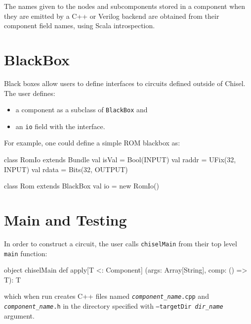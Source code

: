 \documentclass[10pt,twocolumn]{article}
\def\code#1{{\small\tt #1}}
\begin{document}
The names given to the nodes and subcomponents stored in a component
when they are emitted by a C++ or Verilog backend are obtained from
their component field names, using Scala introspection.


\section{BlackBox}

Black boxes allow users to define interfaces to circuits defined
outside of Chisel.  The user defines:

\begin{itemize}
\item a component as a subclass of \code{BlackBox} and
\item an \code{io} field with the interface.
\end{itemize}

\noindent
For example, one could define a simple ROM blackbox as:

\begin{scala}
class RomIo extends Bundle {
  val isVal = Bool(INPUT)
  val raddr = UFix(32, INPUT)
  val rdata = Bits(32, OUTPUT)
}

class Rom extends BlackBox {
  val io = new RomIo()
}
\end{scala}

\section{Main and Testing}

In order to construct a circuit, 
the user calls \code{chiselMain} from their top level \code{main} function:

\begin{scala}
object chiselMain {
  def apply[T <: Component]
    (args: Array[String], comp: () => T): T
}
\end{scala}

\noindent
which when run creates C++ files named
\code{{\it component\_name}.cpp} and \code{{\it component\_name}.h} in
the directory specified with
\code{--targetDir {\it dir\_name}} argument.
\end{document}
